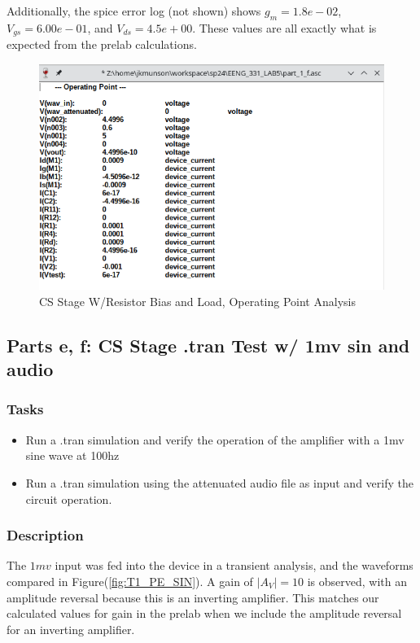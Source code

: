 \documentclass[11pt]{article}
\begin{document}
		Additionally, the spice error log (not shown) shows $g_m = 1.8e-02$, $V_{gs} = 6.00e-01$, and $V_{ds} = 4.5e+00$. These values are all exactly what is expected from the prelab calculations.
		
	\begin{figure}[h]
		\centering
		\includegraphics[width=0.85\linewidth]{task_1_d_operating_point}
		\caption{CS Stage W/Resistor Bias and Load, Operating Point Analysis}
		\label{fig:T1_PD_OP}
		\vspace{1mm}
	\end{figure}
	
	\subsection{Parts e, f: CS Stage .tran Test w/ 1mv sin and audio}
		\subsubsection{Tasks}
		\begin{itemize}
			\item Run a .tran simulation and verify the operation of the amplifier with a 1mv sine wave at 100hz
			\item Run a .tran simulation using the attenuated audio file as input and verify the circuit operation.
		\end{itemize}
	
		\subsubsection{Description}
			The $1mv$ input was fed into the device in a transient analysis, and the waveforms compared in Figure(\ref{fig:T1_PE_SIN}). A gain of $|A_V| = 10$ is observed, with an amplitude reversal because this is an inverting amplifier. This matches our calculated values for gain in the prelab when we include the amplitude reversal for an inverting amplifier. 
			
\end{document}
